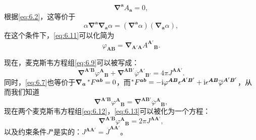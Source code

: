 \begin{equation*}
	\boldsymbol{\nabla }^{\boldsymbol{a}} A_{\boldsymbol{a}} =0,
\end{equation*}
根据\ref{eq:6.2}，这等价于
\begin{equation*}
	\alpha \boldsymbol{\nabla }^{\boldsymbol{a}}\boldsymbol{\nabla }_{\boldsymbol{a}} \alpha =(\boldsymbol{\nabla }^{\boldsymbol{a}} \alpha )(\boldsymbol{\nabla }_{\boldsymbol{a}} \alpha ),
\end{equation*}
在这个条件下，\ref{eq:6.11}可以化简为
\begin{equation*}
	\varphi _{\boldsymbol{AB}} =\boldsymbol{\nabla }_{\boldsymbol{A} '\boldsymbol{A}} A^{\boldsymbol{A} '}{}_{\boldsymbol{B}} .
\end{equation*}


现在，麦克斯韦方程组\ref{eq:6.9}可以被写成：
\begin{equation}
	\boldsymbol{\nabla }^{\boldsymbol{A} '\boldsymbol{B}} \varphi ^{\boldsymbol{A}}{}_{\boldsymbol{B}} +\boldsymbol{\nabla }^{\boldsymbol{AB} '}\overline{\varphi }^{\boldsymbol{A} '}{}_{\boldsymbol{B} '} =4\pi J^{\boldsymbol{AA} '} .
	\label{eq:6.12}
\end{equation}
同时，\ref{eq:6.7}也等价于$\boldsymbol{\nabla }_{\boldsymbol{a}}\prescript{*}{}{} F^{\boldsymbol{ab}} =0$，而$\prescript{*}{}{} F^{\boldsymbol{ab}} =-\mathrm{i} \varphi ^{\boldsymbol{AB}} \epsilon ^{\boldsymbol{A} '\boldsymbol{B} '} +\mathrm{i} \epsilon ^{\boldsymbol{AB}}\overline{\varphi }^{\boldsymbol{A} '\boldsymbol{B} '}$，从而我们知道
\begin{equation}
	\boldsymbol{\nabla }^{\boldsymbol{A} '\boldsymbol{B}} \varphi ^{\boldsymbol{A}}{}_{\boldsymbol{B}} =\boldsymbol{\nabla }^{\boldsymbol{AB} '}\overline{\varphi }^{\boldsymbol{A}}{}_{\boldsymbol{B}} ,
	\label{eq:6.13}
\end{equation}
现在两个麦克斯韦方程组\ref{eq:6.12}，\ref{eq:6.13}可以被化为一个方程：
\begin{equation}
	\boldsymbol{\nabla }^{\boldsymbol{A} '\boldsymbol{B}} \varphi ^{\boldsymbol{A}}{}_{\boldsymbol{B}} =2\pi J^{\boldsymbol{AA} '} ,
	\label{eq:6.14}
\end{equation}
以及约束条件$J^{\boldsymbol{a}}$是实的：$J^{\boldsymbol{AA} '} =\overline{J}^{\boldsymbol{AA} '}$。



